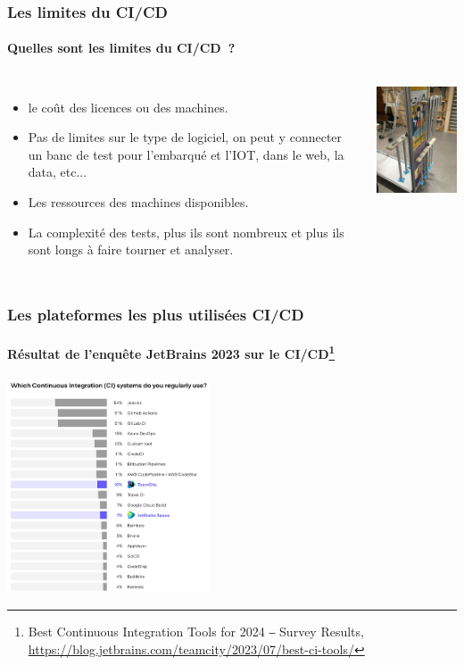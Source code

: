 \documentclass{beamer}
\begin{document}
    \begin{frame}
        \frametitle{Les limites du CI/CD}
        \framesubtitle{Quelles sont les limites du CI/CD~?}
        \transdissolve
        \pause
        \begin{columns}
            \begin{itemize}
                \item le coût des licences ou des machines.
                \item Pas de limites sur le type de logiciel, on peut y connecter un banc de test pour l'embarqué et l'IOT, dans le web, la data, etc...
                \item Les ressources des machines disponibles.
                \item La complexité des tests, plus ils sont nombreux et plus ils sont longs à faire tourner et analyser.
            \end{itemize}
            \centering
            \includegraphics[width=5cm]{image/somfy-test-bench.jpg}
        \end{columns}
    \end{frame}

    \begin{frame}
        \frametitle{Les plateformes les plus utilisées CI/CD}
        \framesubtitle{Résultat de l'enquête JetBrains 2023 sur le CI/CD\footnote{Best Continuous Integration Tools for 2024 ‒ Survey Results, \url{https://blog.jetbrains.com/teamcity/2023/07/best-ci-tools/}}}
        \transdissolve
        \centering
        \includegraphics[width=6cm]{image/ci-jetbrains-survey.png}
    \end{frame}
\end{document}
